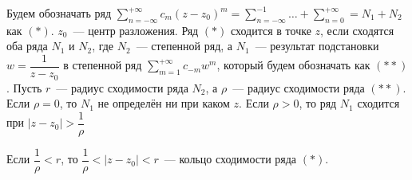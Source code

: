 
Будем обозначать ряд \(\sum\limits_{n = -\infty}^{+\infty} c_m(z-z_0)^m = \sum\limits_{n = -\infty}
^{-1}\dots + \sum\limits_{n = 0}^{+\infty} = N_1 + N_2\) как \((*)\). \(z_0\)~--- центр разложения.
Ряд \((*)\) сходится в точке \(z\), если сходятся оба ряда \(N_1\) и \(N_2\), где \(N_2\)~---
степенной ряд, а \(N_1\)~--- результат подстановки \(w = \dfrac{1}{z-z_0}\) в степенной ряд 
\(\sum\limits_{m = 1}^{+\infty}c_{-m}w^m\), который будем обозначать как \((**)\). Пусть \(r\)~--- 
радиус сходимости ряда \(N_2\), а \(\rho\)~--- радиус сходимости ряда \((**)\). Если \(\rho = 0\), 
то \(N_1\) не определён ни при каком \(z\). Если \(\rho > 0\), то ряд \(N_1\) сходится при 
\(|z-z_0| > \dfrac{1}{\rho}\)

\begin{definition}
    Если \(\dfrac{1}{\rho} < r\), то \(\dfrac{1}{\rho} < |z - z_0| < r\)~--- кольцо сходимости ряда
    \((*)\).
\end{definition}